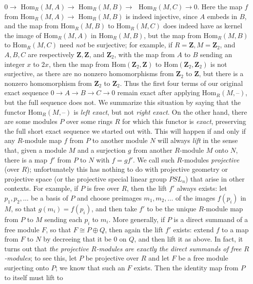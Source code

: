 \documentclass[10pt]{article}
\begin{document}
$0\rightarrow\,\,$Hom$_R(M,A)\rightarrow\,\,$Hom$_R(M,B)\rightarrow\,\,$
Hom$_R(M,C)\rightarrow0$. Here the map $f$ from
Hom$_R(M,A)\rightarrow\,\,$Hom$_R(M,B)$ is indeed injective, since $A$
embeds in $B$, and the map from Hom$_R(M,B)$ to Hom$_R(M,C)$ does indeed
have as kernel the image of Hom$_R(M,A)$ in Hom$_R(M,B)$, but the map
from Hom$_R(M,B)$ to Hom$_R(M,C)$ need {\sl not} be surjective; for
example, if $R=\mathbf{Z}, M = \mathbf{Z}_2$, and $A,B,C$ are
respectively $\mathbf{Z}, \mathbf{Z}$, and $\mathbf{Z}_2$, with the map
from $A$ to $B$ sending an integer $x$ to $2x$, then the map from
Hom$(\mathbf{Z}_2,\mathbf{Z})$ to Hom$(\mathbf{Z}_2, \mathbf{Z}_2)$ is
not surjective, as there are no nonzero homomorphisms from
$\mathbf{Z}_2$ to $\mathbf{Z}$, but there is a nonzero homomorphism from
$\mathbf{Z}_2$ to $\mathbf{Z}_2$. Thus the first four terms of our
original exact sequence $0\rightarrow A\rightarrow B\rightarrow
C\rightarrow 0$ remain exact after applying Hom$_R(M,\text{--})$, but
the full sequence does not. We summarize this situation by saying that
the functor Hom$_R(M,\text{--})$ is {\sl left exact}, but not {\sl right
  exact}. On the other hand, there are some modules $P$ over some rings
$R$ for which this functor is {\sl exact}, preserving the full short
exact sequence we started out with. This will happen if and only if any
$R$-module map $f$ from $P$ to another module $N$ will always {\sl lift}
in the sense that, given a module $M$ and a surjection $g$ from another
$R$-module $M$ onto $N$, there is a map $f'$ from $P$ to $N$ with $f=
gf'$. We call such $R$-modules {\sl projective} (over $R$);
unfortunately this has nothing to do with projective geometry or
projective space (or the projective special linear group $PSL_n$) that
arise in other contexts. For example, if $P$ is free over $R$, then the
lift $f'$ always exists: let $p_1,p_2,\ldots$ be a basis of $P$ and
choose preimages $m_1,m_2,\ldots$ of the images $f(p_i)$ in $M$, so that
$g(m_i) = f(p_i)$, and then take $f'$ to be the unique $R$-module map
from $P$ to $M$ sending each $p_i$ to $m_i$. More generally, if $P$ is a
direct summand of a free module $F$, so that $F\cong P\oplus Q$, then
again the lift $f'$ exists: extend $f$ to a map from $F$ to $N$ by
decreeing that it be 0 on $Q$, and then lift it as above. In fact, it
turns out that {\sl the projective $R$-modules are exactly the direct
  summands of free $R$-modules}; to see this, let $P$ be projective over
$R$ and let $F$ be a free module surjecting onto $P$; we know that such
an $F$ exists. Then the identity map from $P$ to itself must lift to
\end{document}
